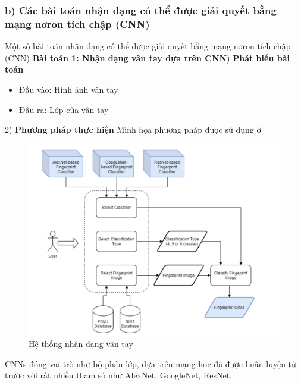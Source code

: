 \documentclass{article}
\begin{document}
	\subsubsection{b) Các bài toán nhận dạng có thể được giải quyết bằng mạng nơron tích chập (CNN)}
	\qquad Một số bài toán nhận dạng có thể được giải quyết bằng mạng  nơron tích chập (CNN)\newline
	\textbf{Bài toán 1: Nhận dạng vân tay dựa trên CNN}) \textbf{Phát biểu bài toán}\newline
	\begin{itemize}
		\item Đầu vào: Hình ảnh vân tay
		\item Đầu ra: Lớp của vân tay
	\end{itemize}
	2) \textbf{Phương pháp thực hiện}\newline
	Minh họa phương pháp được sử dụng ở \cite{sym13050750}
	\begin{figure}[H]
		\centering
		\includegraphics[width=0.75\linewidth]{images/finger_recognition.png}
		\caption{Hệ thống nhận dạng vân tay}
		\label{fig:writing-thesis}
	\end{figure}
	CNNs đóng vai trò như bộ phân lớp, dựa trên mạng học đã được huấn luyện từ trước với rất nhiều tham số như AlexNet, GoogleNet, ResNet.
	
\end{document}
